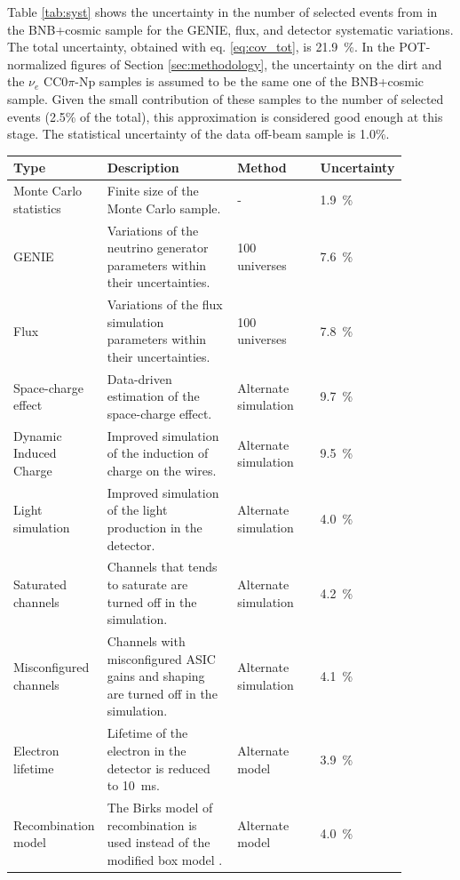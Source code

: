 \vspace{1em}
Table \ref{tab:syst} shows the uncertainty in the number of selected events from in the BNB+cosmic sample for the GENIE, flux, and detector systematic variations. The total uncertainty, obtained with eq. \ref{eq:cov_tot}, is 21.9~\%. In the POT-normalized figures of Section \ref{sec:methodology}, the uncertainty on the dirt and the $\nu_{e}$ CC$0\pi$-Np samples is assumed to be the same one of the BNB+cosmic sample. Given the small contribution of these samples to the number of selected events (2.5\% of the total), this approximation is considered good enough at this stage. The statistical uncertainty of the data off-beam sample is 1.0\%. 

\begin{table}[htbp]
\footnotesize{
   \centering
   \begin{tabular}{p{0.23\linewidth}p{0.33\linewidth}p{0.21\linewidth}p{0.11\linewidth}}
     \toprule
     Type & Description & Method & Uncertainty \\
     \midrule
     Monte Carlo statistics & Finite size of the Monte Carlo sample. & - & 1.9~\%\\
     GENIE & Variations of the neutrino generator parameters within their uncertainties. & 100 universes & 7.6~\%\\
     Flux & Variations of the flux simulation parameters within their uncertainties. & 100 universes & 7.8~\%\\
     Space-charge effect & Data-driven estimation of the space-charge effect. & Alternate simulation & 9.7~\%\\
     Dynamic Induced Charge & Improved simulation of the induction of charge on the wires. & Alternate simulation & 9.5~\%\\
     Light simulation & Improved simulation of the light production in the detector. & Alternate simulation & 4.0~\%\\
     Saturated channels & Channels that tends to saturate are turned off in the simulation. & Alternate simulation & 4.2~\%\\
     Misconfigured channels & Channels with misconfigured ASIC gains and shaping are turned off in the simulation. & Alternate simulation & 4.1~\%\\
     Electron lifetime & Lifetime of the electron in the detector is reduced to 10~ms. & Alternate model & 3.9~\%\\
     Recombination model & The Birks model of recombination \cite{Amoruso:2004dy} is used instead of the modified box model \cite{Acciarri:2013met}. & Alternate model & 4.0~\%\\

\end{tabular}}
\end{table}
